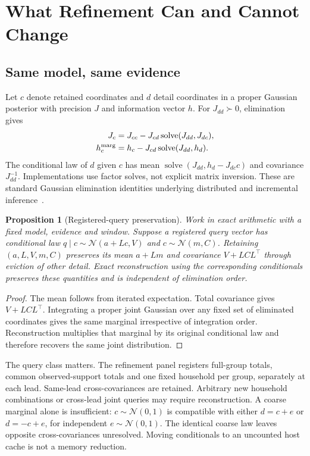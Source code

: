 \documentclass[conference]{IEEEtran}
\newtheorem{proposition}{Proposition}
\begin{document}
\section{What Refinement Can and Cannot Change}
\subsection{Same model, same evidence}
Let $c$ denote retained coordinates and $d$ detail coordinates in a proper Gaussian posterior with precision $J$ and information vector $h$. For $J_{dd}\succ0$, elimination gives
\begin{align}
J_c&=J_{cc}-J_{cd}\operatorname{solve}(J_{dd},J_{dc}),\label{eq:schur}\\
h_c^{\rm marg}&=h_c-J_{cd}\operatorname{solve}(J_{dd},h_d).
\end{align}
The conditional law of $d$ given $c$ has mean $\operatorname{solve}(J_{dd},h_d-J_{dc}c)$ and covariance $J_{dd}^{-1}$. Implementations use factor solves, not explicit matrix inversion. These are standard Gaussian elimination identities underlying distributed and incremental inference~\cite{distributed,isam}.

\begin{proposition}[Registered-query preservation]
Work in exact arithmetic with a fixed model, evidence and window. Suppose a registered query vector has conditional law
$q\mid c\sim\mathcal N(a+Lc,V)$ and $c\sim\mathcal N(m,C)$. Retaining $(a,L,V,m,C)$ preserves its mean $a+Lm$ and covariance $V+LCL^\top$ through eviction of other detail. Exact reconstruction using the corresponding conditionals preserves these quantities and is independent of elimination order.
\end{proposition}
\begin{proof}
The mean follows from iterated expectation. Total covariance gives $V+LCL^\top$. Integrating a proper joint Gaussian over any fixed set of eliminated coordinates gives the same marginal irrespective of integration order. Reconstruction multiplies that marginal by its original conditional law and therefore recovers the same joint distribution.
\end{proof}

The query class matters. The refinement panel registers full-group totals, common observed-support totals and one fixed household per group, separately at each lead. Same-lead cross-covariances are retained. Arbitrary new household combinations or cross-lead joint queries may require reconstruction. A coarse marginal alone is insufficient: $c\sim\mathcal N(0,1)$ is compatible with either $d=c+e$ or $d=-c+e$, for independent $e\sim\mathcal N(0,1)$. The identical coarse law leaves opposite cross-covariances unresolved. Moving conditionals to an uncounted host cache is not a memory reduction.
\end{document}
